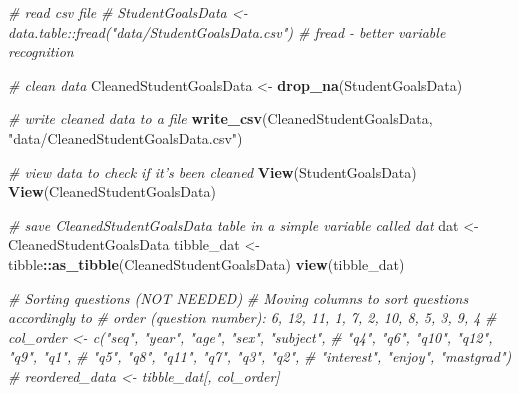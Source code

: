 \documentclass[]{article}
\newenvironment{Shaded}{\begin{snugshade}}{\end{snugshade}}
\newcommand{\CommentTok}[1]{\textcolor[rgb]{0.56,0.35,0.01}{\textit{#1}}}
\newcommand{\KeywordTok}[1]{\textcolor[rgb]{0.13,0.29,0.53}{\textbf{#1}}}
\newcommand{\NormalTok}[1]{#1}
\newcommand{\OperatorTok}[1]{\textcolor[rgb]{0.81,0.36,0.00}{\textbf{#1}}}
\newcommand{\StringTok}[1]{\textcolor[rgb]{0.31,0.60,0.02}{#1}}
\begin{document}
\begin{Shaded}
\begin{Highlighting}[]
\CommentTok{# read csv file}
\CommentTok{# StudentGoalsData <- data.table::fread("data/StudentGoalsData.csv") # fread - better variable recognition}

\CommentTok{# clean data}
\NormalTok{CleanedStudentGoalsData <-}\StringTok{ }\KeywordTok{drop_na}\NormalTok{(StudentGoalsData)}

\CommentTok{# write cleaned data to a file}
\KeywordTok{write_csv}\NormalTok{(CleanedStudentGoalsData, }\StringTok{"data/CleanedStudentGoalsData.csv"}\NormalTok{)}

\CommentTok{# view data to check if it's been cleaned}
\KeywordTok{View}\NormalTok{(StudentGoalsData)}
\KeywordTok{View}\NormalTok{(CleanedStudentGoalsData)}

\CommentTok{# save CleanedStudentGoalsData table in a simple variable called dat}
\NormalTok{dat <-}\StringTok{ }\NormalTok{CleanedStudentGoalsData}
\NormalTok{tibble_dat <-}\StringTok{ }\NormalTok{tibble}\OperatorTok{::}\KeywordTok{as_tibble}\NormalTok{(CleanedStudentGoalsData)}
\KeywordTok{view}\NormalTok{(tibble_dat)}

\CommentTok{# Sorting questions (NOT NEEDED)}
\CommentTok{# Moving columns to sort questions accordingly to}
\CommentTok{# order (question number): 6, 12, 11, 1, 7, 2, 10, 8, 5, 3, 9, 4}
\CommentTok{# col_order <- c("seq", "year", "age", "sex", "subject", }
\CommentTok{#                "q4", "q6", "q10", "q12", "q9", "q1", }
\CommentTok{#                "q5", "q8", "q11", "q7", "q3", "q2",}
\CommentTok{#                "interest", "enjoy", "mastgrad")}
\CommentTok{# reordered_data <- tibble_dat[, col_order]}


\end{Highlighting}
\end{Shaded}
\end{document}
